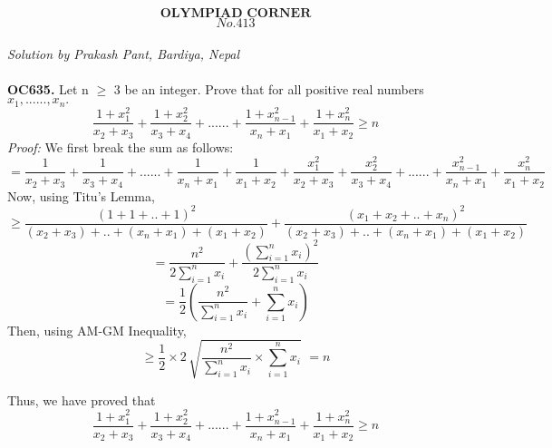 \documentclass[12pt]{article}
\begin{document}
\[\textbf{OLYMPIAD CORNER}\]
\[No. 413\] \\
\textit{Solution by Prakash Pant, Bardiya, Nepal} \\ \\
\textbf{OC635.} Let n $\ge$ 3 be an integer. Prove that for all positive real numbers $x_1,......,x_n.$
\[ \frac{1+ x_1^{2}}{x_2 + x_3} + \frac{1+ x_2^{2}}{x_3 + x_4} + ......+ \frac{1+ x_{n-1}^{2}}{x_n + x_1} + \frac{1+ x_n^{2}}{x_1 + x_2} \ge n																	\]
\textit{Proof:}
We first break the sum as follows:\\
\[= \frac{1}{x_2 + x_3} + \frac{1}{x_3 + x_4} + ......+ \frac{1}{x_n + x_1} + \frac{1}{x_1 + x_2} + \frac{ x_1^{2}}{x_2 + x_3} + \frac{ x_2^{2}}{x_3 + x_4} + ......+ \frac{ x_{n-1}^{2}}{x_n + x_1} + \frac{ x_n^{2}}{x_1 + x_2} 								\]
Now, using Titu's Lemma,
\[ \ge \frac{(1+1+..+1)^2}{(x_2 + x_3) +..+(x_n+x_1)+(x_1+x_2)} + \frac{(x_1+x_2+..+x_n)^2}{(x_2 + x_3)+..+(x_n+x_1)+(x_1+x_2)}									\]
\[ = \frac{n^2}{2\sum_{i=1}^{n} x_i} + \frac{(\sum_{i=1}^{n} x_i)^2}{2\sum_{i=1}^{n} x_i}	\]
\[ = \frac{1}{2} ( \frac{n^2}{\sum_{i=1}^{n} x_i}  +\sum_{i=1}^{n} x_i )						\]
Then, using AM-GM Inequality,
\[ \ge \frac{1}{2} \times 2\, \sqrt{\frac{n^2}{\sum_{i=1}^{n} x_i} \times \sum_{i=1}^{n} x_i }	\,\, = n\]

Thus, we have proved that \[ \frac{1+ x_1^{2}}{x_2 + x_3} + \frac{1+ x_2^{2}}{x_3 + x_4} + ......+ \frac{1+ x_{n-1}^{2}}{x_n + x_1} + \frac{1+ x_n^{2}}{x_1 + x_2} \ge n \]																						
\end{document}
